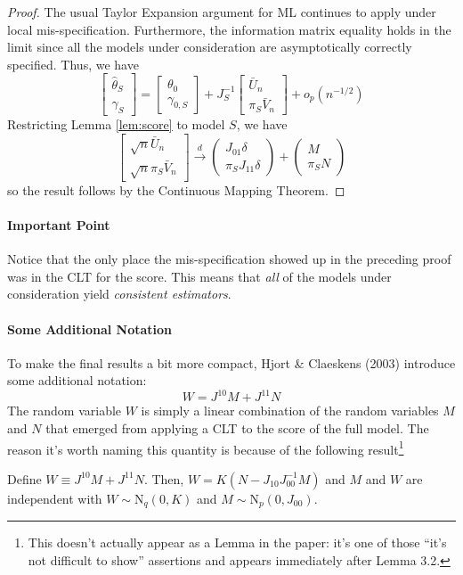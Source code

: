 \begin{proof}
The usual Taylor Expansion argument for ML continues to apply under local mis-specification.
Furthermore, the information matrix equality holds in the limit since all the models under consideration are asymptotically correctly specified. 
Thus, we have
$$\left[\begin{array}{c}
\widehat{\theta}_S \\ \widehat{\gamma}_S
\end{array} \right] = \left[\begin{array}{c}
\theta_0 \\ \gamma_{0,S}
\end{array} \right] + J_S^{-1}\left[\begin{array}
{c} \bar{U}_n \\ \pi_S \bar{V}_n
\end{array}\right] + o_p(n^{-1/2}) $$
Restricting Lemma \ref{lem:score} to model $S$, we have
$$\left[\begin{array}{c}
\sqrt{n} \bar{U}_n \\ \sqrt{n} \pi_S \bar{V}_n
\end{array}\right] \overset{d}{\rightarrow}
\left(\begin{array}{c}
J_{01}\delta\\
\pi_S J_{11}\delta
\end{array}\right) +
\left(\begin{array}{c}
M\\
\pi_S N
\end{array}\right)$$
so the result follows by the Continuous Mapping Theorem.
\end{proof}

\paragraph{Important Point} Notice that the only place the mis-specification showed up in the preceding proof was in the CLT for the score. 
This means that \emph{all} of the models under consideration yield \emph{consistent estimators}.

\paragraph{Some Additional Notation}
To make the final results a bit more compact, Hjort \& Claeskens (2003) introduce some additional notation:
$$W = J^{10}M + J^{11} N$$
The random variable $W$	is simply a linear combination of the random variables $M$ and $N$ that emerged from applying a CLT to the score of the full model. 
The reason it's worth naming this quantity is because of the following result\footnote{This doesn't actually appear as a Lemma in the paper: it's one of those ``it's not difficult to show'' assertions and appears immediately after Lemma 3.2.}
\begin{lem}
\label{lem:W}
Define $W\equiv J^{10}M+J^{11}N$. Then, $W= K(N - J_{10}J_{00}^{-1}M)$ and $M$ and $W$ are independent with $W\sim \mbox{N}_q(0,K)$ and $M\sim\mbox{N}_p(0,J_{00})$.
\end{lem}

